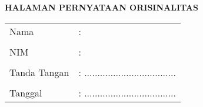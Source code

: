\clearpage
{}%

\begin{center}
	\smallskip
	
	\normalsize \bfseries \MakeUppercase{Halaman Pernyataan Orisinalitas}
	
	\normalsize {}
	\vspace{3cm}
	
	\centering 
	\begin{tabular}{l l}
		Nama 			& : \theauthor \\
		& \\
		NIM 			& : \printnim \\
		& \\
		Tanda Tangan 	& : ................................... \\
		& \\
		Tanggal 		& : ................................... \\
	\end{tabular}
	
\end{center}
\clearpage
